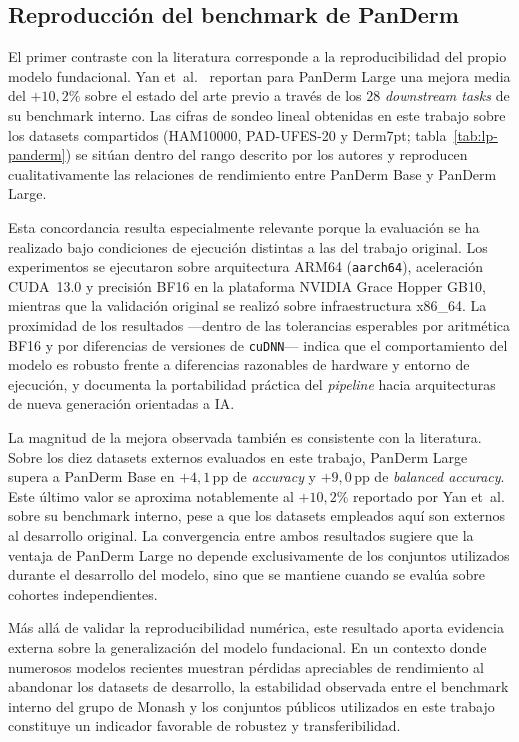 \subsection{Reproducción del benchmark de PanDerm}
\label{sec:lit-panderm}

El primer contraste con la literatura corresponde a la
reproducibilidad del propio modelo fundacional.
Yan et~al.~\cite{panderm2025} reportan para PanDerm Large una mejora
media del $+10{,}2\%$ sobre el estado del arte previo a través de los
$28$ \emph{downstream tasks} de su benchmark interno. Las cifras de
sondeo lineal obtenidas en este trabajo sobre los datasets compartidos
(HAM10000, PAD-UFES-20 y Derm7pt; tabla~\ref{tab:lp-panderm}) se sitúan
dentro del rango descrito por los autores y reproducen cualitativamente
las relaciones de rendimiento entre PanDerm Base y PanDerm Large.

Esta concordancia resulta especialmente relevante porque la evaluación
se ha realizado bajo condiciones de ejecución distintas a las del
trabajo original. Los experimentos se ejecutaron sobre arquitectura
ARM64 (\texttt{aarch64}), aceleración CUDA~13.0 y precisión BF16 en la
plataforma NVIDIA Grace Hopper GB10, mientras que la validación original
se realizó sobre infraestructura x86\_64. La proximidad de los
resultados ---dentro de las tolerancias esperables por aritmética BF16 y
por diferencias de versiones de \texttt{cuDNN}--- indica que el
comportamiento del modelo es robusto frente a diferencias razonables de
hardware y entorno de ejecución, y documenta la portabilidad práctica
del \emph{pipeline} hacia arquitecturas de nueva generación orientadas a
IA.

La magnitud de la mejora observada también es consistente con la
literatura. Sobre los diez datasets externos evaluados en este trabajo,
PanDerm Large supera a PanDerm Base en $+4{,}1$\,pp de \emph{accuracy} y
$+9{,}0$\,pp de \emph{balanced accuracy}. Este último valor se aproxima
notablemente al $+10{,}2\%$ reportado por Yan et~al. sobre su benchmark
interno, pese a que los datasets empleados aquí son externos al
desarrollo original. La convergencia entre ambos resultados sugiere que
la ventaja de PanDerm Large no depende exclusivamente de los conjuntos
utilizados durante el desarrollo del modelo, sino que se mantiene cuando
se evalúa sobre cohortes independientes.

Más allá de validar la reproducibilidad numérica, este resultado aporta
evidencia externa sobre la generalización del modelo fundacional. En un
contexto donde numerosos modelos recientes muestran pérdidas apreciables
de rendimiento al abandonar los datasets de desarrollo, la estabilidad
observada entre el benchmark interno del grupo de Monash y los conjuntos
públicos utilizados en este trabajo constituye un indicador favorable de
robustez y transferibilidad.


